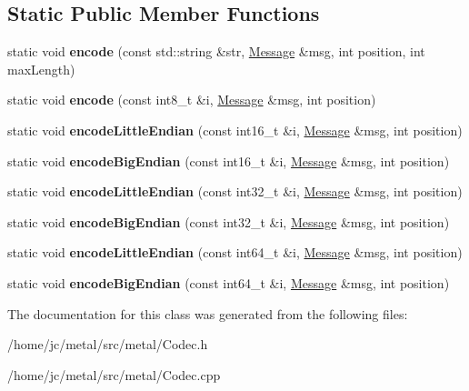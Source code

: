 \subsection*{Static Public Member Functions}
\begin{DoxyCompactItemize}
\item 
\hypertarget{classMetal_1_1Codec_a6ba3a30358ee1d925d36ca2352339ecb}{}static void {\bfseries encode} (const std\+::string \&str, \hyperlink{classMetal_1_1Message}{Message} \&msg, int position, int max\+Length)\label{classMetal_1_1Codec_a6ba3a30358ee1d925d36ca2352339ecb}

\item 
\hypertarget{classMetal_1_1Codec_a735d410b92c6209426c35ed6b7228cac}{}static void {\bfseries encode} (const int8\+\_\+t \&i, \hyperlink{classMetal_1_1Message}{Message} \&msg, int position)\label{classMetal_1_1Codec_a735d410b92c6209426c35ed6b7228cac}

\item 
\hypertarget{classMetal_1_1Codec_a1c885cc8d6bd0e1e41064f5d96695cc9}{}static void {\bfseries encode\+Little\+Endian} (const int16\+\_\+t \&i, \hyperlink{classMetal_1_1Message}{Message} \&msg, int position)\label{classMetal_1_1Codec_a1c885cc8d6bd0e1e41064f5d96695cc9}

\item 
\hypertarget{classMetal_1_1Codec_af017a852f13da38d33926f0eda171da2}{}static void {\bfseries encode\+Big\+Endian} (const int16\+\_\+t \&i, \hyperlink{classMetal_1_1Message}{Message} \&msg, int position)\label{classMetal_1_1Codec_af017a852f13da38d33926f0eda171da2}

\item 
\hypertarget{classMetal_1_1Codec_a796f4a871e2113286607bf0e93f1c101}{}static void {\bfseries encode\+Little\+Endian} (const int32\+\_\+t \&i, \hyperlink{classMetal_1_1Message}{Message} \&msg, int position)\label{classMetal_1_1Codec_a796f4a871e2113286607bf0e93f1c101}

\item 
\hypertarget{classMetal_1_1Codec_a338f378655819f66be12ede9a09d0266}{}static void {\bfseries encode\+Big\+Endian} (const int32\+\_\+t \&i, \hyperlink{classMetal_1_1Message}{Message} \&msg, int position)\label{classMetal_1_1Codec_a338f378655819f66be12ede9a09d0266}

\item 
\hypertarget{classMetal_1_1Codec_ab33fd9d4bba018d8efbab701f58ccff6}{}static void {\bfseries encode\+Little\+Endian} (const int64\+\_\+t \&i, \hyperlink{classMetal_1_1Message}{Message} \&msg, int position)\label{classMetal_1_1Codec_ab33fd9d4bba018d8efbab701f58ccff6}

\item 
\hypertarget{classMetal_1_1Codec_a20ae33fa4bcba44602b6c862fe182506}{}static void {\bfseries encode\+Big\+Endian} (const int64\+\_\+t \&i, \hyperlink{classMetal_1_1Message}{Message} \&msg, int position)\label{classMetal_1_1Codec_a20ae33fa4bcba44602b6c862fe182506}

\end{DoxyCompactItemize}


The documentation for this class was generated from the following files\+:\begin{DoxyCompactItemize}
\item 
/home/jc/metal/src/metal/Codec.\+h\item 
/home/jc/metal/src/metal/Codec.\+cpp\end{DoxyCompactItemize}
